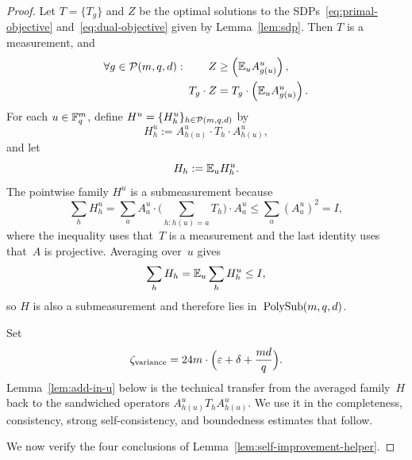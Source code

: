\begin{proof}
  \leanok
  Let $T=\{T_g\}$ and $Z$ be the optimal solutions to the SDPs~\eqref{eq:primal-objective} and~\eqref{eq:dual-objective} given by Lemma~\ref{lem:sdp}. Then $T$ is a measurement, and
  \begin{align}
    \forall g \in \mathcal{P}(m,q,d): \qquad
    Z &\geq \left(\mathbb{E}_{u} A^{u}_{g(u)}\right), \label{eq:Z-greater-than-A}\\
    T_g \cdot Z &= T_g \cdot \left(\mathbb{E}_{u} A^{u}_{g(u)}\right). \label{eq:swap-Z-for-A}
  \end{align}
  For each $u \in \mathbb{F}_q^m$, define $H^u=\{H_h^u\}_{h \in \mathcal{P}(m,q,d)}$ by
  \[
    H_h^u := A^u_{h(u)} \cdot T_h \cdot A^u_{h(u)},
  \]
  and let
  \[
    H_h := \mathbb{E}_{u} H_h^u.
  \]
  The pointwise family $H^u$ is a submeasurement because
  \[
    \sum_h H_h^u
    = \sum_a A_a^u \cdot \Big(\sum_{h:h(u)=a} T_h\Big)\cdot A_a^u
    \le \sum_a (A_a^u)^2
    = I,
  \]
  where the inequality uses that~$T$ is a measurement and the last identity uses
  that~$A$ is projective. Averaging over~$u$ gives
  \[
    \sum_h H_h
    = \mathbb{E}_{u} \sum_h H_h^u
    \le I,
  \]
  so $H$ is also a submeasurement and therefore lies in~$\mathrm{PolySub}(m,q,d)$.

  Set
  \[
    \zeta_{\mathrm{variance}} = 24m\cdot\Big(\varepsilon + \delta + \frac{md}{q}\Big).
  \]
  Lemma~\ref{lem:add-in-u} below is the technical transfer from the averaged family~$H$ back to the sandwiched operators $A^u_{h(u)}T_hA^u_{h(u)}$. We use it in the completeness, consistency, strong self-consistency, and boundedness estimates that follow.

  We now verify the four conclusions of Lemma~\ref{lem:self-improvement-helper}.


\end{proof}
